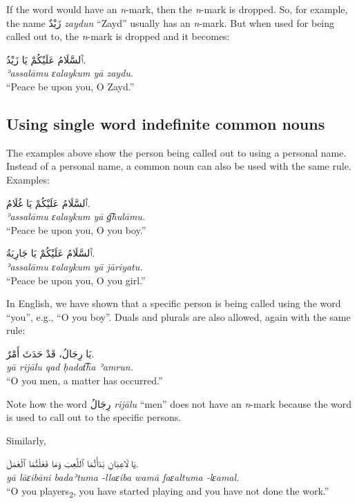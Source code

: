 \documentclass[
  10pt,
]{book}
\begin{document}
If the word would have an \emph{n}-mark, then the \emph{n}-mark is dropped. So, for example, the name \foreignlanguage{arabic}{زَيْدٌ} \emph{zaydun} \enquote{Zayd} usually has an \emph{n}-mark. But when used for being called out to, the \emph{n}-mark is dropped and it becomes:

\foreignlanguage{arabic}{ٱَلسَّلَامُ عَلَيْکُمْ يَا زَيْدُ.}\\
\emph{ʾassalāmu ɛalaykum yā zaydu.}\\
\enquote{Peace be upon you, O Zayd.}

\subsection{Using single word indefinite common nouns}\label{using-single-word-indefinite-common-nouns}

The examples above show the person being called out to using a personal name. Instead of a personal name, a common noun can also be used with the same rule. Examples:

\foreignlanguage{arabic}{ٱَلسَّلَامُ عَلَيْکُمْ يَا غُلَامُ.}\\
\emph{ʾassalāmu ɛalaykum yā g͡hulāmu.}\\
\enquote{Peace be upon you, O you boy.}

\foreignlanguage{arabic}{ٱَلسَّلَامُ عَلَيْکُمْ يَا جَارِيَةُ.}\\
\emph{ʾassalāmu ɛalaykum yā jāriyatu.}\\
\enquote{Peace be upon you, O you girl.}

In English, we have shown that a specific person is being called using the word \enquote{you}, e.g., \enquote{O you boy}. Duals and plurals are also allowed, again with the same rule:

\foreignlanguage{arabic}{يَا رِجَالُ، قَدْ حَدَثَ أَمْرٌ.}\\
\emph{yā rijālu qad ḥadat͡ha ʾamrun.}\\
\enquote{O you men, a matter has occurred.}

Note how the word \foreignlanguage{arabic}{رِجَالُ} \emph{rijālu} \enquote{men} does not have an \emph{n}-mark because the word is used to call out to the specific persons.

Similarly,

\foreignlanguage{arabic}{يَا لَاعِبَانِ بَدَأْتُمَا ٱللَّعِبَ وَمَا فَعَلْتُمَا ٱلْعَمَلَ.}\\
\emph{yā lāɛibāni badaʾtuma -llaɛiba wamā faɛaltuma -lɛamal.}\\
\enquote{O you players\textsubscript{2}, you have started playing and you have not done the work.}
\end{document}
